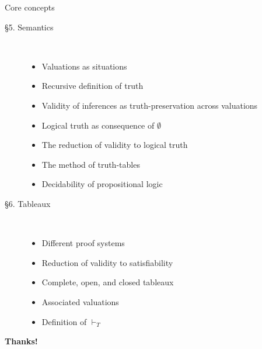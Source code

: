 \begin{frame}{Core concepts}

	\begin{description}
	
		\item[\S5. Semantics] \
		
			\begin{itemize}
			
				\item Valuations as situations
				
				\item Recursive definition of truth
				
				\item Validity of inferences as truth-preservation across valuations
				
				\item Logical truth as consequence of $\emptyset$
				
				\item The reduction of validity to logical truth
				
				\item The method of truth-tables
			
				\item Decidability of propositional logic
			
			\end{itemize}
	
		\item[\S6. Tableaux] \
		
			\begin{itemize}
									
				\item Different proof systems
				
				\item Reduction of validity to satisfiability
				
				\item Complete, open, and closed tableaux
				
				\item Associated valuations
				
				\item Definition of $\vdash_T$
			
			\end{itemize}
	
	\end{description}

\end{frame}

\begin{frame}

	\begin{center}
	{\huge\bf Thanks!}
	\end{center}

\end{frame}

